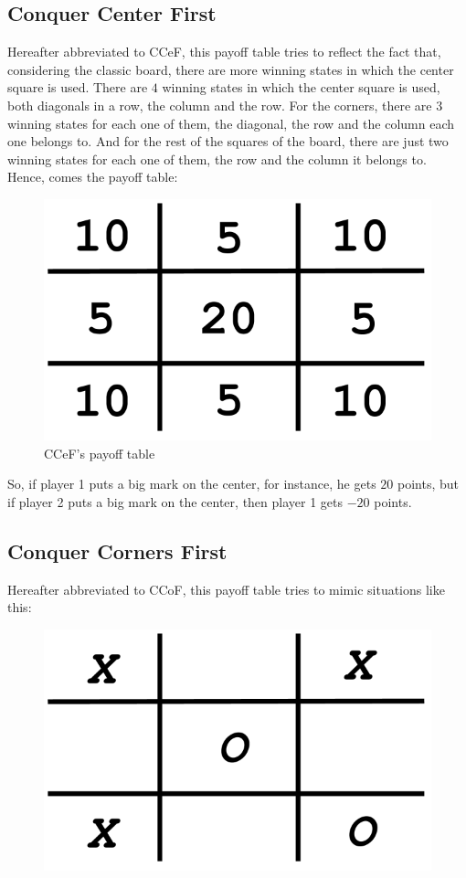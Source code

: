 \documentclass[10pt]{article}
\begin{document}
\subsection{Conquer Center First}
Hereafter abbreviated to CCeF, this payoff table tries to reflect the fact that, considering the classic board, there are more winning states in which the center square is used. There are $4$ winning states in which the center square is used, both diagonals in a row, the column and the row. For the corners, there are $3$ winning states for each one of them, the diagonal, the row and the column each one belongs to. And for the rest of the squares of the board, there are just two winning states for each one of them, the row and the column it belongs to. Hence, comes the payoff table:

\begin{figure}[H]
\centering
\includegraphics[scale=0.2]{img/ptable1.png}
\caption{CCeF's payoff table}
\end{figure}

So, if player 1 puts a big mark on the center, for instance, he gets $20$ points, but if player 2 puts a big mark on the center, then player 1 gets $-20$ points.

\subsection{Conquer Corners First}
Hereafter abbreviated to CCoF, this payoff table tries to mimic situations like this:

\begin{figure}[H]
\centering
\includegraphics[scale=0.2]{img/situation1.png}
\end{figure}
\end{document}

